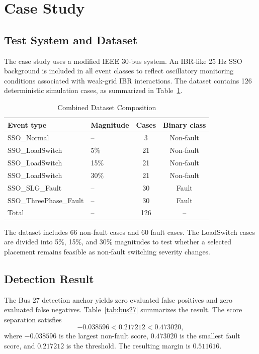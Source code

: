 \documentclass[conference]{IEEEtran}
\begin{document}
\section{Case Study}

\subsection{Test System and Dataset}

The case study uses a modified IEEE 30-bus system. An IBR-like 25 Hz SSO background is included in all event classes to reflect oscillatory monitoring conditions associated with weak-grid IBR interactions. The dataset contains 126 deterministic simulation cases, as summarized in Table~\ref{tab:dataset}.

\begin{table}[t]
\caption{Combined Dataset Composition}
\label{tab:dataset}
\centering
\begin{tabular}{llcc}
\toprule
Event type & Magnitude & Cases & Binary class\\
\midrule
SSO\_Normal & -- & 3 & Non-fault\\
SSO\_LoadSwitch & 5\% & 21 & Non-fault\\
SSO\_LoadSwitch & 15\% & 21 & Non-fault\\
SSO\_LoadSwitch & 30\% & 21 & Non-fault\\
SSO\_SLG\_Fault & -- & 30 & Fault\\
SSO\_ThreePhase\_Fault & -- & 30 & Fault\\
\midrule
Total & -- & 126 & --\\
\bottomrule
\end{tabular}
\end{table}

The dataset includes 66 non-fault cases and 60 fault cases. The LoadSwitch cases are divided into 5\%, 15\%, and 30\% magnitudes to test whether a selected placement remains feasible as non-fault switching severity changes.

\subsection{Detection Result}

The Bus 27 detection anchor yields zero evaluated false positives and zero evaluated false negatives. Table~\ref{tab:bus27} summarizes the result. The score separation satisfies
\begin{equation}
-0.038596 < 0.217212 < 0.473020,
\end{equation}
where $-0.038596$ is the largest non-fault score, $0.473020$ is the smallest fault score, and $0.217212$ is the threshold. The resulting margin is $0.511616$.
\end{document}

